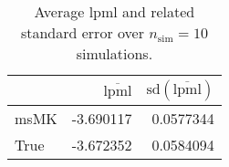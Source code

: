 \begin{table}[H]

\caption{Average lpml and related standard error over $n_{\text{sim}} = 10$ simulations.}
\centering
\begin{tabular}[t]{lrr}
\toprule
  & $\overbar{\text{lpml}}$ & $\text{sd}(\overbar{\text{lpml}})$\\
\midrule
msMK & -3.690117 & 0.0577344\\
True & -3.672352 & 0.0584094\\
\bottomrule
\end{tabular}
\end{table}